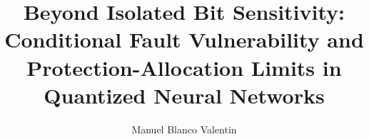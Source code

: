 \title[Conditional Fault Vulnerability in Quantized Networks]{Beyond Isolated Bit Sensitivity: Conditional Fault Vulnerability and Protection-Allocation Limits in Quantized Neural Networks}
\author{Manuel Blanco Valentin}
\renewcommand{\shortauthors}{Blanco Valentin}
